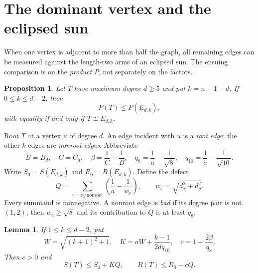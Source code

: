 \documentclass[11pt,a4paper]{article}
\numberwithin{equation}{section}
\newtheorem{lemma}[theorem]{Lemma}
\newtheorem{proposition}[theorem]{Proposition}
\begin{document}
\section{The dominant vertex and the eclipsed sun}
When one vertex is adjacent to more than half the graph, all remaining edges can be measured against the length-two arms of an eclipsed sun. The ensuing comparison is on the \emph{product} $P$, not separately on the factors.
\begin{proposition}\label{prop:structure}
Let $T$ have maximum degree $d\ge5$ and put $k=n-1-d$. If $0\le k\le d-2$, then
\[P(T)\le P(E_{d,k}),\]
with equality if and only if $T\cong E_{d,k}$.
\end{proposition}
Root $T$ at a vertex $u$ of degree $d$. An edge incident with $u$ is a \emph{root edge}; the other $k$ edges are \emph{nonroot edges}. Abbreviate
\[
B=B_d,\quad C=C_d,\quad\beta=\frac1C-\frac1B,\quad
q_8=\frac1a-\frac1{\sqrt8},\quad q_{10}=\frac1a-\frac1{\sqrt{10}}.
\]
Write $S_0=S(E_{d,k})$ and $R_0=R(E_{d,k})$. Define the defect
\begin{equation}\label{eq:defect}
Q=\sum_{e=xy\ \text{nonroot}}\left(\frac1a-\frac1{w_e}\right),\qquad
w_e=\sqrt{d_x^2+d_y^2}.
\end{equation}
Every summand is nonnegative. A nonroot edge is \emph{bad} if its degree pair is not $(1,2)$; then $w_e\ge\sqrt8$ and its contribution to $Q$ is at least $q_8$.
\begin{lemma}\label{lem:two-sided}
If $1\le k\le d-2$, put
\[
W=\sqrt{(k+1)^2+1},\quad K=aW+\frac{k-1}{2dq_{10}},\quad
c=1-\frac{2\beta}{q_8}.
\]
Then $c>0$ and
\begin{equation}\label{eq:two-sided}
S(T)\le S_0+KQ,\qquad R(T)\le R_0-cQ.
\end{equation}
\end{lemma}
\end{document}
